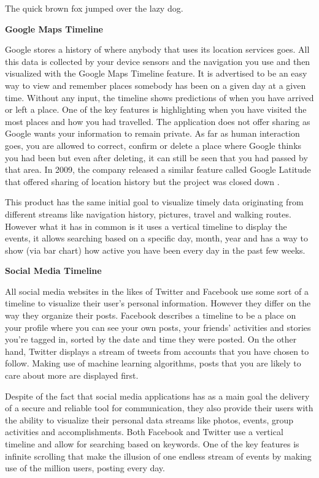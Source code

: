 \documentclass{l4proj}
\begin{document}
The quick brown fox \cite{am97} jumped over the lazy dog.

\textbf{Google Maps Timeline \cite{GoogleMapsTimeline}}

Google stores a history of where anybody that uses its location services goes. All this data is collected by your device sensors and the navigation you use and then visualized with the Google Maps Timeline feature. It is advertised to be an easy way to view and remember places somebody has been on a given day at a given time. Without any input, the timeline shows predictions of when you have arrived or left a place. One of the key features is highlighting when you have visited the most places and how you had travelled. The application does not offer sharing as Google wants your information to remain private. As far as human interaction goes, you are allowed to correct, confirm or delete a place where Google thinks you had been but even after deleting,  it can still be seen that you had passed by that area. In 2009, the company released a similar feature called Google Latitude that offered sharing of location history but the project was closed down \cite{GMTimeFeature}.


This product has the same initial goal to visualize timely data originating from different streams like navigation history, pictures, travel and walking routes. However what it has in common is it uses a vertical timeline to display the events, it allows searching based on a specific day, month, year and has a way to show (via bar chart) how active you have been every day in the past few weeks. 

\textbf{Social Media Timeline}

All social media websites in the likes of Twitter and Facebook use some sort of a timeline to visualize their user's personal information. However they differ on the way they organize their posts. Facebook describes a timeline to be a place on your profile where you can see your own posts, your friends' activities and stories you're tagged in, sorted by the date and time they were posted. On the other hand, Twitter displays a stream of tweets from accounts that you have chosen to follow. Making use of machine learning algorithms, posts that you are likely to care about more are displayed first.


Despite of the fact that social media applications has as a main goal the delivery of a secure and reliable tool for communication, they also provide their users with the ability to visualize their personal data streams like photos, events, group activities and accomplishments. Both Facebook and Twitter use a vertical timeline and allow for searching based on keywords. One of the key features is infinite scrolling that make the illusion of one endless stream of events by making use of the million users, posting every day. 
\end{document}
